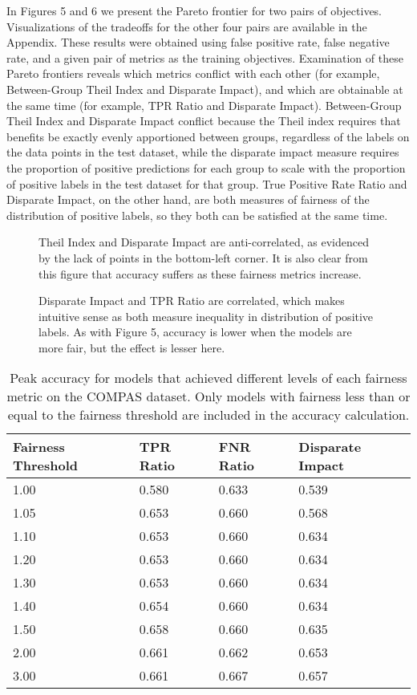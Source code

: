 \documentclass{elsarticle}
\newcommand{\figures}[4]{
	\begin{figure}[H]{
		\centering{
			\texttt{[image: \#1]}
		}
		\caption{#2}
		}
	\end{figure}
	\begin{figure}[H] {
		\centering{
			\texttt{[image: \#3]}
		}
		\caption{#4}
	}
	\end{figure}
}
\begin{document}
In Figures 5 and 6 we present the Pareto frontier for two pairs of objectives. Visualizations of the tradeoffs for the other four pairs are available in the Appendix. These results were obtained using false positive rate, false negative rate, and a given pair of metrics as the training objectives. Examination of these Pareto frontiers reveals which metrics conflict with each other (for example, Between-Group Theil Index and Disparate Impact), and which are obtainable at the same time (for example, TPR Ratio and Disparate Impact). Between-Group Theil Index and Disparate Impact conflict because the Theil index requires that benefits be exactly evenly apportioned between groups, regardless of the labels on the data points in the test dataset, while the disparate impact measure requires the proportion of positive predictions for each group to scale with the proportion of positive labels in the test dataset for that group. True Positive Rate Ratio and Disparate Impact, on the other hand, are both measures of fairness of the distribution of positive labels, so they both can be satisfied at the same time. 

\figures{Between-Group Theil Index|Disparate Impact|COMPAS.png}{Theil Index and Disparate Impact are anti-correlated, as evidenced by the lack of points in the bottom-left corner. It is also clear from this figure that accuracy suffers as these fairness metrics increase.}{TPR Ratio|Disparate Impact|COMPAS.png}{Disparate Impact and TPR Ratio are correlated, which makes intuitive sense as both measure inequality in distribution of positive labels. As with Figure 5, accuracy is lower when the models are more fair, but the effect is lesser here.}


\renewcommand{\arraystretch}{1.5}
\begin{table}
	\begin{center}
	\begin{tabular}{| l | l | l | l |}
	\hline
	Fairness Threshold & TPR Ratio & FNR Ratio & Disparate Impact \\ \hline
	1.00  & 0.580 & 0.633 & 0.539 \\ \hline
	1.05  & 0.653 & 0.660 & 0.568 \\ \hline
	1.10  & 0.653 & 0.660 & 0.634 \\ \hline
	1.20  & 0.653 & 0.660 & 0.634 \\ \hline
	1.30  & 0.653 & 0.660 & 0.634 \\ \hline
	1.40  & 0.654 & 0.660 & 0.634 \\ \hline
	1.50  & 0.658 & 0.660 & 0.635 \\ \hline
	2.00  & 0.661 & 0.662 & 0.653 \\ \hline
	3.00  & 0.661 & 0.667 & 0.657 \\ \hline
	\end{tabular}
	\end{center}
\caption{Peak accuracy for models that achieved different levels of each fairness metric on the COMPAS dataset. Only models with fairness less than or equal to the fairness threshold are included in the accuracy calculation.}
\end{table}
\end{document}
